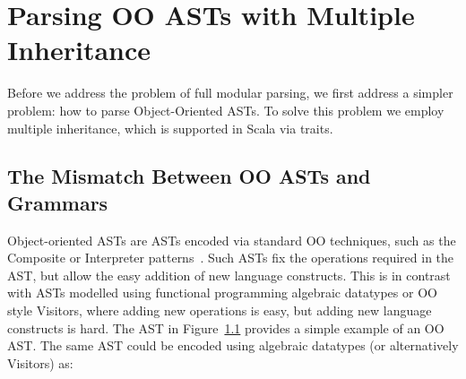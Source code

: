 \begin{comment}
Basically, \name consists of four parts: underlying parsing technique, delegation mechanism encoded by open recursion, Object Algebras, and glue code of new combinators and utility functions. We start from Section \ref{subsec:overview-parsing}, which discusses the choice of parsing technique and how it affects modularity of parsers. Section \ref{subsec:overview-problem} demonstrates the goal of extending parsers together with ASTs in a semantic modular way, with both separate compilation and type-safe code reuse. Then we will see traditional parser combinators fail to achieve it because of hard-coded recursive calls. In Section \ref{subsec:overview-delegation}, we show how delegation can solve this problem and allow us to build extensible parsers. Finally, Section \ref{subsec:overview-oa} gives examples of using Object Algebras for more extensibility, including extension of operations and parsing multiple sorts of syntax.\haoyuan{TODO}
\end{comment}

\begin{comment}
It is worth mentioning that the choice of parser combinators will not
affect the other parts of our library. One can choose other parser
combinators like Parsec, in cases that the performance and supporting
of left-recursion are not major concerns. A different library can even build a new
\name with fancy features or higher efficiency.
\end{comment}


\section{Parsing OO ASTs with Multiple Inheritance}\label{sec:inheritance}

Before we address the problem of full modular parsing, we first
address a simpler problem: how to parse Object-Oriented ASTs. To solve
this problem we employ multiple inheritance, which is supported in
Scala via traits.

\subsection{The Mismatch Between OO ASTs and Grammars}
Object-oriented ASTs are ASTs encoded via standard OO techniques, 
such as the {\sc Composite} or {\sc Interpreter} patterns~\cite{gamma94design}. Such ASTs 
fix the operations required in the AST, but allow the easy addition of new 
language constructs. This is in contrast with ASTs modelled using 
functional programming algebraic datatypes or OO style Visitors, where 
adding new operations is easy, but adding new language constructs is hard.
The AST in Figure~\ref{} provides a simple example of an OO AST. The same 
AST could be encoded using algebraic datatypes (or alternatively Visitors) 
as:

